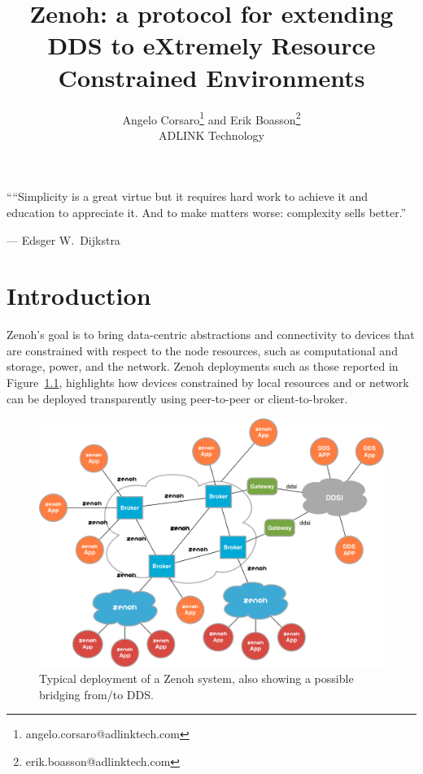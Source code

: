 \documentclass[a4paper,oneside,article]{memoir}
\begin{document}
\title{Zenoh: a protocol for extending DDS to eXtremely Resource Constrained Environments}
\author{Angelo Corsaro\thanks{angelo.corsaro@adlinktech.com} and Erik Boasson\thanks{erik.boasson@adlinktech.com} \\ ADLINK Technology}

\maketitle

\epigraphfontsize{\small\itshape}
\epigraph{``“Simplicity is a great virtue but it requires hard work to achieve it and education to appreciate it. And to make matters worse: complexity sells better.''}{--- \textup{Edsger W.\ Dijkstra}}

\chapter{Introduction}

Zenoh's goal is to bring data-centric abstractions and connectivity to devices that are constrained with respect to the node resources, such as computational and storage, power, and the network.  Zenoh deployments such as those reported in Figure~\ref{fig:typical-deployment}, highlights how devices constrained by local resources and or network can be deployed transparently using peer-to-peer or client-to-broker.

\begin{figure}
  \centering
  \includegraphics[scale=0.3]{typical-deployment.png}
  \caption{Typical deployment of a Zenoh system, also showing a possible bridging from/to DDS\@.}\label{fig:typical-deployment}
\end{figure}
\end{document}
